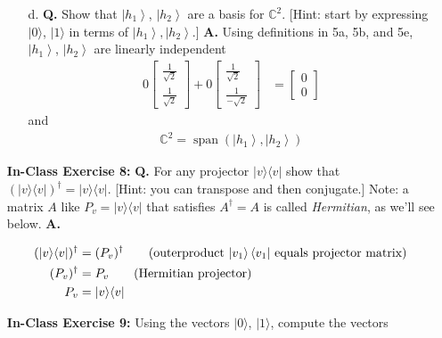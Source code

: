 \documentclass[main.tex]{subfiles}
\begin{document}
\begin{enumerate}
\begin{enumerate}
        \item[d.] \textbf{Q.} Show that $\left|h_{1}\right\rangle$, $\left|h_{2}\right\rangle$ are a basis for $\mathbb{C}^2$. [Hint: start by expressing $|0\rangle$, $|1\rangle$ in terms of $\left|h_{1}\right\rangle,\left|h_{2}\right\rangle$.] \textbf{A.} Using definitions in 5a, 5b, and 5e, $\left|h_{1}\right\rangle$, $\left|h_{2}\right\rangle$ are linearly independent 
       \begin{align*}
            0 \left[\begin{array}{l} \frac{1}{\sqrt{2}} \\ \frac{1}{\sqrt{2}} \end{array}\right] 
            + 0 \left[\begin{array}{l} \frac{1}{\sqrt{2}} \\ \frac{1}{-\sqrt{2}} \end{array}\right] & = \left[\begin{array}{l} 0 \\ 0 \end{array}\right]
        \end{align*}
        and
        \begin{align*}
            \mathbb{C}^2 = \operatorname{span} \left( \left|h_{1} \right\rangle, \left|h_{2}\right\rangle \right)  
        \end{align*}
    \end{enumerate}

\item[] \textbf{In-Class Exercise 8:} \textbf{Q.} For any projector $|v\rangle\langle v|$ show that $(|v\rangle\langle v|)^{\dagger}=|v\rangle\langle v|$. [Hint: you can transpose and then conjugate.] Note: a matrix $A$ like $P_{v}=|v\rangle\langle v|$ that satisfies $A^{\dagger}=A$ is called \emph{Hermitian}, as we'll see below. \textbf{A.}

    \begin{align*}
        (|v\rangle\langle v|)^{\dagger} & = (P_{v})^{\dagger} \tag {outerproduct $\left|v_{1}\right\rangle\left\langle v_{1}\right|$ equals projector matrix}\\    
        (P_{v})^{\dagger} & = P_{v} \tag{Hermitian projector}\\
        P_{v} & = |v\rangle\langle v|
    \end{align*}

\item[] \textbf{In-Class Exercise 9:} Using the vectors $|0\rangle$, $|1\rangle$, compute the vectors


\end{enumerate}
\end{document}
